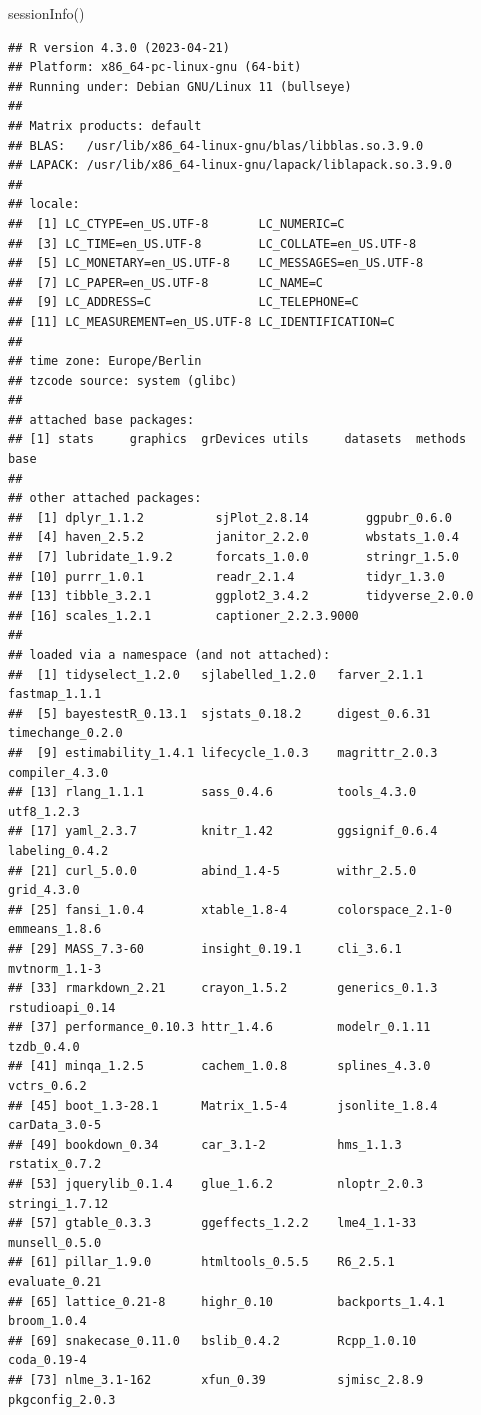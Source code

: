 \documentclass[
  12pt,
  oneside]{book}
\newenvironment{Shaded}{\begin{snugshade}}{\end{snugshade}}
\newcommand{\FunctionTok}[1]{\textcolor[rgb]{0.00,0.00,0.00}{#1}}
\newcommand{\NormalTok}[1]{#1}
\theoremstyle{definition}
\theoremstyle{definition}
\theoremstyle{definition}
\theoremstyle{definition}
\theoremstyle{remark}
\begin{document}
\begin{Shaded}
\begin{Highlighting}[]
\FunctionTok{sessionInfo}\NormalTok{()}
\end{Highlighting}
\end{Shaded}

\begin{verbatim}
## R version 4.3.0 (2023-04-21)
## Platform: x86_64-pc-linux-gnu (64-bit)
## Running under: Debian GNU/Linux 11 (bullseye)
## 
## Matrix products: default
## BLAS:   /usr/lib/x86_64-linux-gnu/blas/libblas.so.3.9.0 
## LAPACK: /usr/lib/x86_64-linux-gnu/lapack/liblapack.so.3.9.0
## 
## locale:
##  [1] LC_CTYPE=en_US.UTF-8       LC_NUMERIC=C              
##  [3] LC_TIME=en_US.UTF-8        LC_COLLATE=en_US.UTF-8    
##  [5] LC_MONETARY=en_US.UTF-8    LC_MESSAGES=en_US.UTF-8   
##  [7] LC_PAPER=en_US.UTF-8       LC_NAME=C                 
##  [9] LC_ADDRESS=C               LC_TELEPHONE=C            
## [11] LC_MEASUREMENT=en_US.UTF-8 LC_IDENTIFICATION=C       
## 
## time zone: Europe/Berlin
## tzcode source: system (glibc)
## 
## attached base packages:
## [1] stats     graphics  grDevices utils     datasets  methods   base     
## 
## other attached packages:
##  [1] dplyr_1.1.2          sjPlot_2.8.14        ggpubr_0.6.0        
##  [4] haven_2.5.2          janitor_2.2.0        wbstats_1.0.4       
##  [7] lubridate_1.9.2      forcats_1.0.0        stringr_1.5.0       
## [10] purrr_1.0.1          readr_2.1.4          tidyr_1.3.0         
## [13] tibble_3.2.1         ggplot2_3.4.2        tidyverse_2.0.0     
## [16] scales_1.2.1         captioner_2.2.3.9000
## 
## loaded via a namespace (and not attached):
##  [1] tidyselect_1.2.0   sjlabelled_1.2.0   farver_2.1.1       fastmap_1.1.1     
##  [5] bayestestR_0.13.1  sjstats_0.18.2     digest_0.6.31      timechange_0.2.0  
##  [9] estimability_1.4.1 lifecycle_1.0.3    magrittr_2.0.3     compiler_4.3.0    
## [13] rlang_1.1.1        sass_0.4.6         tools_4.3.0        utf8_1.2.3        
## [17] yaml_2.3.7         knitr_1.42         ggsignif_0.6.4     labeling_0.4.2    
## [21] curl_5.0.0         abind_1.4-5        withr_2.5.0        grid_4.3.0        
## [25] fansi_1.0.4        xtable_1.8-4       colorspace_2.1-0   emmeans_1.8.6     
## [29] MASS_7.3-60        insight_0.19.1     cli_3.6.1          mvtnorm_1.1-3     
## [33] rmarkdown_2.21     crayon_1.5.2       generics_0.1.3     rstudioapi_0.14   
## [37] performance_0.10.3 httr_1.4.6         modelr_0.1.11      tzdb_0.4.0        
## [41] minqa_1.2.5        cachem_1.0.8       splines_4.3.0      vctrs_0.6.2       
## [45] boot_1.3-28.1      Matrix_1.5-4       jsonlite_1.8.4     carData_3.0-5     
## [49] bookdown_0.34      car_3.1-2          hms_1.1.3          rstatix_0.7.2     
## [53] jquerylib_0.1.4    glue_1.6.2         nloptr_2.0.3       stringi_1.7.12    
## [57] gtable_0.3.3       ggeffects_1.2.2    lme4_1.1-33        munsell_0.5.0     
## [61] pillar_1.9.0       htmltools_0.5.5    R6_2.5.1           evaluate_0.21     
## [65] lattice_0.21-8     highr_0.10         backports_1.4.1    broom_1.0.4       
## [69] snakecase_0.11.0   bslib_0.4.2        Rcpp_1.0.10        coda_0.19-4       
## [73] nlme_3.1-162       xfun_0.39          sjmisc_2.8.9       pkgconfig_2.0.3
\end{verbatim}

  
\end{document}
